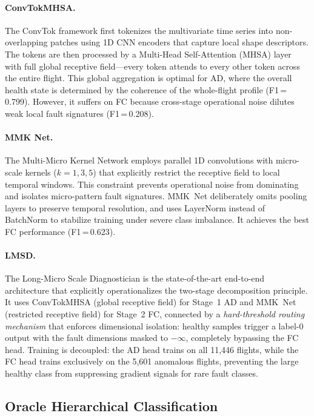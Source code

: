 \paragraph{ConvTokMHSA.}
The ConvTok framework \cite{convtok2023} first tokenizes the multivariate time
series into non-overlapping patches using 1D CNN encoders that capture local
shape descriptors. The tokens are then processed by a Multi-Head Self-Attention
(MHSA) layer with full global receptive field---every token attends to every
other token across the entire flight. This global aggregation is optimal for AD,
where the overall health state is determined by the coherence of the whole-flight
profile (F1\,=\,0.799). However, it suffers on FC because cross-stage
operational noise dilutes weak local fault signatures (F1\,=\,0.208).

\paragraph{MMK Net.}
The Multi-Micro Kernel Network \cite{lmsd2025} employs parallel 1D convolutions
with micro-scale kernels ($k = 1, 3, 5$) that explicitly restrict the receptive
field to local temporal windows. This constraint prevents operational noise from
dominating and isolates micro-pattern fault signatures. MMK~Net deliberately
omits pooling layers to preserve temporal resolution, and uses LayerNorm instead
of BatchNorm to stabilize training under severe class imbalance. It achieves the
best FC performance (F1\,=\,0.623).

\paragraph{LMSD.}
The Long-Micro Scale Diagnostician \cite{lmsd2025} is the state-of-the-art
end-to-end architecture that explicitly operationalizes the two-stage decomposition
principle. It uses ConvTokMHSA (global receptive field) for Stage~1 AD and
MMK~Net (restricted receptive field) for Stage~2 FC, connected by a
\textit{hard-threshold routing mechanism} that enforces dimensional isolation:
healthy samples trigger a label-0 output with the fault dimensions masked to
$-\infty$, completely bypassing the FC head. Training is decoupled: the AD head
trains on all 11{,}446 flights, while the FC head trains exclusively on the
5{,}601 anomalous flights, preventing the large healthy class from suppressing
gradient signals for rare fault classes.

\subsection{Oracle Hierarchical Classification}
\label{subsec:oracle}

